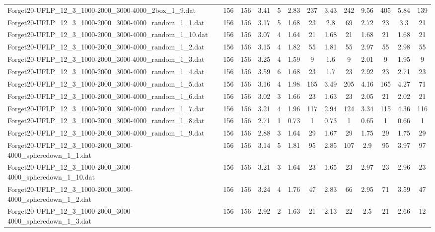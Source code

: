 \begin{table}[!ht]
{\begin{tabular}{lcccccccccccc}
Forget20-UFLP\_12\_3\_1000-2000\_3000-4000\_2box\_1\_9.dat & 156 & 156 & 3.41 & 5 & 2.83 & 237 & 3.43 & 242 & 9.56 & 405 & 5.84 & 139 \\
Forget20-UFLP\_12\_3\_1000-2000\_3000-4000\_random\_1\_1.dat & 156 & 156 & 3.17 & 5 & 1.68 & 23 & 2.8 & 69 & 2.72 & 23 & 3.3 & 21 \\
Forget20-UFLP\_12\_3\_1000-2000\_3000-4000\_random\_1\_10.dat & 156 & 156 & 3.07 & 4 & 1.64 & 21 & 1.68 & 21 & 1.68 & 21 & 1.68 & 21 \\
Forget20-UFLP\_12\_3\_1000-2000\_3000-4000\_random\_1\_2.dat & 156 & 156 & 3.15 & 4 & 1.82 & 55 & 1.81 & 55 & 2.97 & 55 & 2.98 & 55 \\
Forget20-UFLP\_12\_3\_1000-2000\_3000-4000\_random\_1\_3.dat & 156 & 156 & 3.25 & 4 & 1.59 & 9 & 1.6 & 9 & 2.01 & 9 & 1.95 & 9 \\
Forget20-UFLP\_12\_3\_1000-2000\_3000-4000\_random\_1\_4.dat & 156 & 156 & 3.59 & 6 & 1.68 & 23 & 1.7 & 23 & 2.92 & 23 & 2.71 & 23 \\
Forget20-UFLP\_12\_3\_1000-2000\_3000-4000\_random\_1\_5.dat & 156 & 156 & 3.16 & 4 & 1.98 & 165 & 3.49 & 205 & 4.16 & 165 & 4.27 & 71 \\
Forget20-UFLP\_12\_3\_1000-2000\_3000-4000\_random\_1\_6.dat & 156 & 156 & 3.02 & 3 & 1.66 & 23 & 1.63 & 23 & 2.05 & 21 & 2.02 & 21 \\
Forget20-UFLP\_12\_3\_1000-2000\_3000-4000\_random\_1\_7.dat & 156 & 156 & 3.21 & 4 & 1.96 & 117 & 2.94 & 124 & 3.34 & 115 & 4.36 & 116 \\
Forget20-UFLP\_12\_3\_1000-2000\_3000-4000\_random\_1\_8.dat & 156 & 156 & 2.71 & 1 & 0.73 & 1 & 0.73 & 1 & 0.65 & 1 & 0.66 & 1 \\
Forget20-UFLP\_12\_3\_1000-2000\_3000-4000\_random\_1\_9.dat & 156 & 156 & 2.88 & 3 & 1.64 & 29 & 1.67 & 29 & 1.75 & 29 & 1.75 & 29 \\
Forget20-UFLP\_12\_3\_1000-2000\_3000-4000\_spheredown\_1\_1.dat & 156 & 156 & 3.14 & 5 & 1.81 & 95 & 2.85 & 107 & 2.9 & 95 & 3.97 & 97 \\
Forget20-UFLP\_12\_3\_1000-2000\_3000-4000\_spheredown\_1\_10.dat & 156 & 156 & 3.21 & 3 & 1.64 & 23 & 1.65 & 23 & 2.97 & 23 & 2.96 & 23 \\
Forget20-UFLP\_12\_3\_1000-2000\_3000-4000\_spheredown\_1\_2.dat & 156 & 156 & 3.24 & 4 & 1.76 & 47 & 2.83 & 66 & 2.95 & 71 & 3.59 & 47 \\
Forget20-UFLP\_12\_3\_1000-2000\_3000-4000\_spheredown\_1\_3.dat & 156 & 156 & 2.92 & 2 & 1.63 & 21 & 2.13 & 22 & 2.5 & 21 & 2.66 & 12 \\

\end{tabular}}
\end{table}
